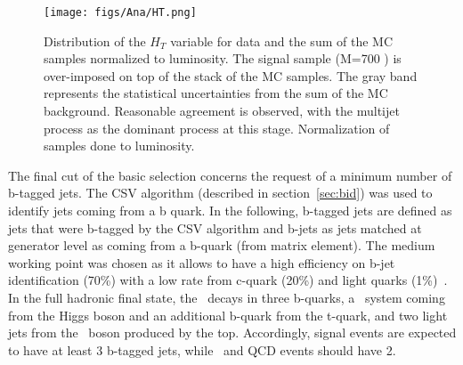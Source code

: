\begin{figure}[!Hhtbp]
  \begin{center}
    \texttt{[image: figs/Ana/HT.png]}
    \caption{Distribution of the $H_{T}$ variable for data and the sum of the MC samples normalized to luminosity. The signal sample (M=700 \GeVcc) is over-imposed on top of the stack of the MC samples. The gray band represents the statistical uncertainties from the sum of the MC background. Reasonable agreement is observed, with the multijet process as the dominant process at this stage. Normalization of samples done to luminosity.}
    \label{fig:HT}
  \end{center}
\end{figure}

The final cut of the basic selection concerns the request of a minimum number of b-tagged jets. The CSV algorithm (described in section~\ref{sec:bid}) was used to identify jets coming from a b quark. In the following, b-tagged jets are defined as jets that were b-tagged by the CSV algorithm and b-jets as jets matched at generator level as coming from a b-quark (from matrix element). The medium working point was chosen as it allows to have a high efficiency on b-jet identification (70\%) with a low rate from c-quark (20\%) and light quarks (1\%)~\cite{Chatrchyan:2012jua, CMS-PAS-BTV-13-001}. In the full hadronic final state, the \Tp~decays in three b-quarks, a \bbbar~system coming from the Higgs boson and an additional b-quark from the t-quark, and two light jets from the \W~boson produced by the top. Accordingly, signal events are expected to have at least 3 b-tagged jets, while \ttbar~and QCD events should have 2.

